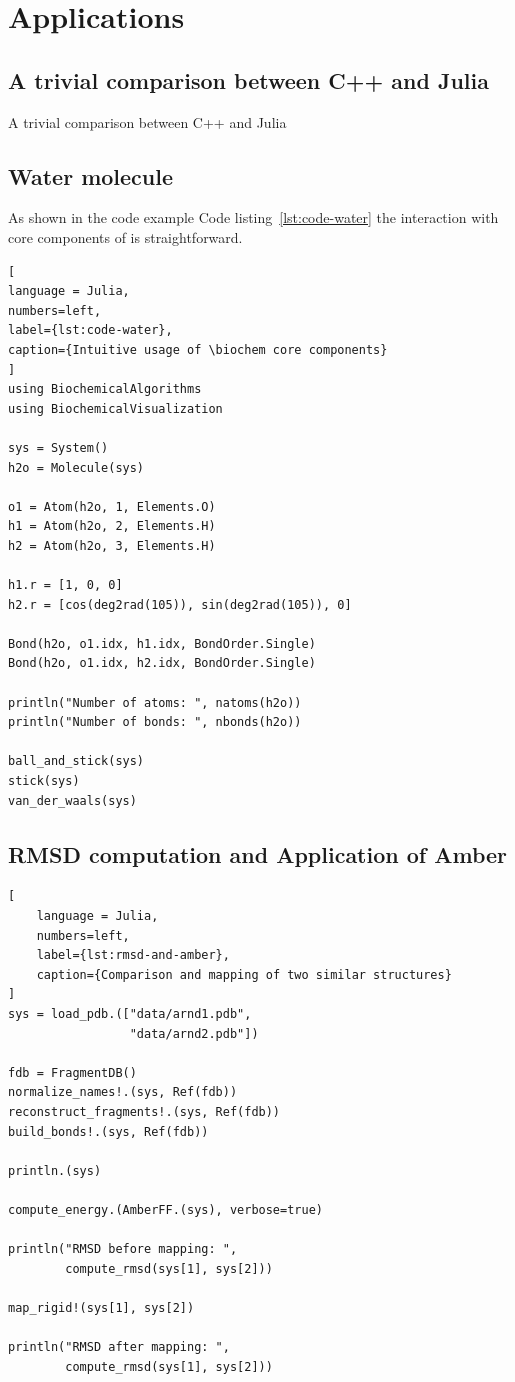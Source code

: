 \section{Applications}

\subsection{A trivial comparison between C++ and Julia}
A trivial comparison between C++ and Julia

\subsection{Water molecule}
As shown in the code example Code listing~\ref{lst:code-water} the interaction with core components of \biochem is straightforward. 
\begin{lstlisting}[
language = Julia, 
numbers=left, 
label={lst:code-water}, 
caption={Intuitive usage of \biochem core components}
]
using BiochemicalAlgorithms
using BiochemicalVisualization

sys = System() 
h2o = Molecule(sys)

o1 = Atom(h2o, 1, Elements.O)
h1 = Atom(h2o, 2, Elements.H)
h2 = Atom(h2o, 3, Elements.H)

h1.r = [1, 0, 0]
h2.r = [cos(deg2rad(105)), sin(deg2rad(105)), 0]

Bond(h2o, o1.idx, h1.idx, BondOrder.Single)
Bond(h2o, o1.idx, h2.idx, BondOrder.Single)

println("Number of atoms: ", natoms(h2o))
println("Number of bonds: ", nbonds(h2o))

ball_and_stick(sys)	
stick(sys)
van_der_waals(sys)
\end{lstlisting}


\subsection{RMSD computation and Application of Amber}


\begin{lstlisting}[
    language = Julia, 
    numbers=left, 
    label={lst:rmsd-and-amber}, 
    caption={Comparison and mapping of two similar structures}
]
sys = load_pdb.(["data/arnd1.pdb", 
				 "data/arnd2.pdb"])

fdb = FragmentDB()
normalize_names!.(sys, Ref(fdb))
reconstruct_fragments!.(sys, Ref(fdb))
build_bonds!.(sys, Ref(fdb))

println.(sys)

compute_energy.(AmberFF.(sys), verbose=true)

println("RMSD before mapping: ", 
		compute_rmsd(sys[1], sys[2]))

map_rigid!(sys[1], sys[2])

println("RMSD after mapping: ", 
		compute_rmsd(sys[1], sys[2]))
\end{lstlisting}


